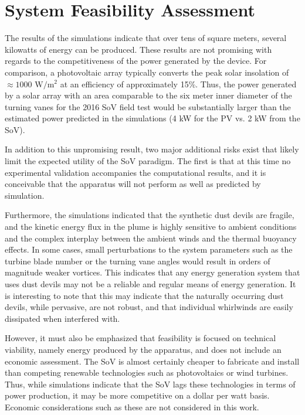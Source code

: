 %
%
\section{System Feasibility Assessment}

The results of the simulations indicate that over tens of square meters,
several kilowatts of energy can be produced. These results are not
promising with regards to the competitiveness of the power generated by
the device. For comparison, a photovoltaic array typically converts 
the peak solar insolation of $\approx 1000 \text{ W}/\text{m}^2$ at an efficiency 
of approximately 15\%. Thus, the power generated by a solar array with 
an area comparable to the six meter inner diameter of the turning 
vanes for the 2016 SoV field test would be substantially larger than 
the estimated power predicted in the simulations 
(4 kW for the PV vs. 2 kW from the SoV). 

In addition to this unpromising result, two major additional risks 
exist that likely limit the expected utility of the SoV paradigm. 
The first is that at this time no experimental validation accompanies the
computational results, and it is conceivable that the apparatus will not
perform as well as predicted by simulation.  

Furthermore, the simulations indicated that the synthetic dust devils 
are fragile, and
the kinetic energy flux in the plume is highly sensitive to ambient
conditions and the complex interplay between the ambient winds and the
thermal buoyancy effects. In some cases, small perturbations to the
system parameters such as the turbine blade number or the turning vane
angles would result in orders of magnitude weaker vortices. 
This indicates that any energy generation system that uses dust
devils may not be a reliable and regular means of energy generation. 
It is interesting to note that this may indicate that the 
naturally occurring dust devils, 
while pervasive, are not robust, and that individual whirlwinds are 
easily dissipated when interfered with. 

However, it must also be emphasized that feasibility is focused on
technical viability, namely energy produced by the apparatus, and does
not include an economic assessment. The SoV is almost certainly cheaper
to fabricate and install than competing renewable technologies such as
photovoltaics or wind turbines. Thus, while simulations indicate that
the SoV lags these technologies in terms of power production, it may be
more competitive on a dollar per watt basis. Economic considerations 
such as these are not considered in this work. 

